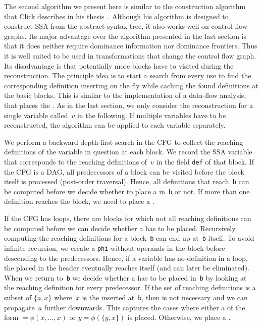 The second algorithm we present here is similar to the construction algorithm that Click describes in his thesis~\cite{click:thesis}.
Although his algorithm is designed to construct SSA from the abstract syntax tree, it also works well on control flow graphs.
Its major advantage over the algorithm presented in the last section is that it does neither require dominance information nor dominance frontiers.
Thus it is well suited to be used in transformations that change the control flow graph.
Its disadvantage is that potentially more blocks have to visited during the reconstruction.
The principle idea is to start a search from every use to find the corresponding definition inserting \phifuns on the fly while caching the found definitions at the basic blocks.
This is similar to the implementation of a data-flow analysis, that places the \phifuns.
As in the last section, we only consider the reconstruction for a single variable called~$v$ in the following.
If multiple variables have to be reconstructed, the algorithm can be applied to each variable separately.

We perform a backward depth-first search in the CFG to collect the reaching definitions of the variable in question at each block.
We record the SSA variable that corresponds to the reaching definitions of~$v$ in the field \verb|def| of that block.
If the CFG is a DAG, all predecessors of a block can be visited before the block itself is processed (post-order traversal).
Hence, all definitions that reach~\verb|b| can be computed before we decide whether to place a \phifun in~\verb|b| or not.
If more than one definition reaches the block, we need to place a \phifun.

If the CFG has loops, there are blocks for which not all reaching definitions can be computed before we can decide whether a \phifun has to be placed.
Recursively computing the reaching definitions for a block~\verb|b| can end up at~\verb|b| itself.
To avoid infinite recursion, we create a \phifun \verb|phi| without operands in the block before descending to the predecessors. 
Hence, if a variable has no definition in a loop, the \phifun placed in the header eventually reaches itself (and can later be eliminated). 
When we return to~\verb|b| we decide whether a \phifun has to be placed in~\verb|b| by looking at the reaching definition for every predecessor.
If the set of reaching definitions is a subset of $\{a,x\}$ where~$x$ is the \phifun inserted at~\verb|b|, then \phifun is not necessary and we can propagate~$a$ further downwards. 
This captures the cases where either a \phifun of the form $=\phi(x,\dots,x)$ or $y=\phi(\{y,x\})$ is placed. 
Otherwise, we place a \phifun.

